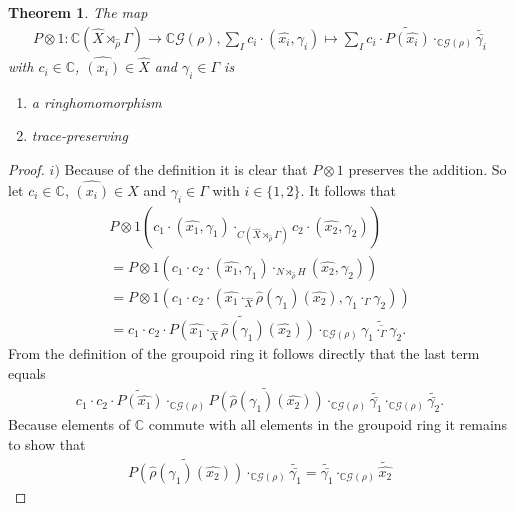 \documentclass[12pt,a4paper]{scrartcl}
\newtheorem{Theorem}{Theorem}[section]
\numberwithin{equation}{section}
\newcommand{\C}{\mathbb{C}} %
\newcommand{\2}{\mathbb{Z} / 2 \mathbb{Z}}
\newcommand{\G}{\mathcal{G}}
\newcommand{\1}{\overline{1}}
\newcommand{\0}{\overline{0}}
\begin{document}
\begin{Theorem}
	The map 
	\begin{align*}
		P \otimes 1: \C(\hat{X} \rtimes_{\hat{\rho}} \Gamma) \to \C\G(\rho), \sum_I c_i \cdot (\hat{x_i}, \gamma_i) \mapsto \sum_I c_i \cdot \widetilde{P(\hat{x_i})} \cdot_{\C\G(\rho)} \widetilde{\bar{\gamma_i}} 
	\end{align*}
	 with $c_i \in \C$, $\hat{(x_i)} \in \hat{X}$ and $\gamma_i \in \Gamma$ is
	\begin{enumerate}
		\item a ringhomomorphism
		\item trace-preserving
	\end{enumerate}
\end{Theorem}
\begin{proof}
	$i)$ Because of the definition it is clear that $P \otimes 1$ preserves the addition. So let $c_i \in \C$, $\hat{(x_i)} \in \hat{X}$ and $\gamma_i \in \Gamma$ with $i \in \{1,2\}$. It follows that
	\begin{align*}
		P \otimes 1(c_1 \cdot (\hat{x_1}, \gamma_1) \cdot_{C(\hat{X} \rtimes_{\hat{\rho}} \Gamma)} c_2 \cdot (\hat{x_2}, \gamma_2))  \\
		= P \otimes 1(c_1 \cdot  c_2 \cdot (\hat{x_1}, \gamma_1) \cdot_{N \rtimes_{\hat{\rho}} H} (\hat{x_2}, \gamma_2)) \\
		=  P \otimes 1(c_1 \cdot  c_2 \cdot (\hat{x_1} \cdot_{\hat{X}} \hat{\rho}(\gamma_1)(\hat{x_2}), \gamma_1 \cdot_{\Gamma} \gamma_2)) \\
		= c_1 \cdot  c_2 \cdot \widetilde{P(\hat{x_1} \cdot_{\hat{X}} \hat{\rho}(\gamma_1)(\hat{x_2}))} \cdot_{\C\G(\rho)} \widetilde{\overline{\gamma_1 \cdot_{\Gamma} \gamma_2}}.
	\end{align*}
	From the definition of the groupoid ring it follows directly that the last term equals 
	\begin{align*}
		c_1 \cdot  c_2 \cdot \widetilde{P(\hat{x_1})} \cdot_{\C\G(\rho)} \widetilde{P(\hat{\rho}(\gamma_1)(\hat{x_2}))} \cdot_{\C\G(\rho)} \widetilde{\bar{\gamma_1}} \cdot_{\C\G(\rho)} \widetilde{\bar{\gamma_2}}.
	\end{align*}
	Because elements of $\C$ commute with all elements in the groupoid ring it remains to show that 
	\begin{align*}
		\widetilde{P(\hat{\rho}(\gamma_1)(\hat{x_2}))} \cdot_{\C\G(\rho)} \widetilde{\bar{\gamma_1}} = \widetilde{\bar{\gamma_1}} \cdot_{\C\G(\rho)} \tilde{\hat{x_2}} 
	\end{align*}

\end{proof}
\end{document}
